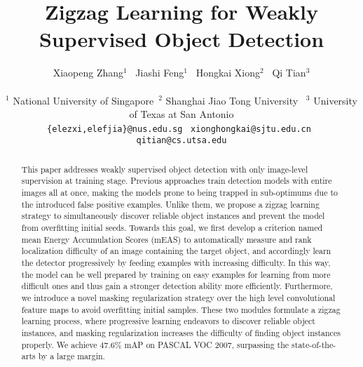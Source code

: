 \documentclass[10pt,twocolumn,letterpaper]{article}
\begin{document}
\title{Zigzag Learning for Weakly Supervised Object Detection}
\author{Xiaopeng Zhang$^{1}$ \, Jiashi Feng$^1$ \, Hongkai Xiong$^2$ \, Qi Tian$^3$\\\\
$^1$ \normalsize {National University of Singapore}\,
$^2$ \normalsize {Shanghai Jiao Tong University} \,
$^3$ \normalsize {University of Texas at San Antonio}\\
{\tt\small \{elezxi,elefjia\}@nus.edu.sg} \,
{\tt\small xionghongkai@sjtu.edu.cn} \, {\tt\small qitian@cs.utsa.edu}
}

\maketitle
\thispagestyle{empty}

\begin{abstract}
This paper addresses weakly supervised object detection with only image-level supervision at training stage. Previous approaches train detection models with entire images all at once, making the models prone to being trapped in sub-optimums due to the introduced false positive examples. Unlike them, we propose a zigzag learning strategy to simultaneously discover reliable object instances and prevent the model from overfitting initial seeds. Towards this goal, we first develop a criterion named mean Energy Accumulation Scores (mEAS) to automatically measure and rank localization difficulty of an image containing the target object, and accordingly learn the detector progressively by feeding examples with increasing difficulty. In this way, the model can be well prepared by training on easy examples for learning from more difficult ones and thus gain a stronger detection ability more efficiently. Furthermore, we introduce a novel masking regularization strategy over the high level convolutional feature maps to avoid overfitting initial samples. These two modules formulate a zigzag learning process, where progressive learning endeavors to discover reliable object instances, and masking regularization increases the difficulty of finding object instances properly. We achieve $47.6\%$ mAP on PASCAL VOC 2007, surpassing the state-of-the-arts by a large margin.
\end{abstract}
\end{document}
